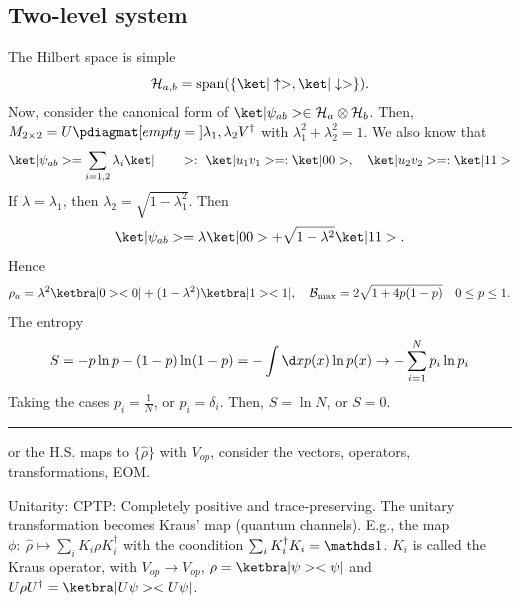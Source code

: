\subsection{Two-level system}

The Hilbert space is simple
\[
  \mathcal H_{a,b} = \operatorname{span}(\{\ket|\uparrow>, \ket|\downarrow>\}).
\]
Now, consider the canonical form of $\ket|\psi_{ab}> \in \mathcal H_a \otimes
\mathcal H_b$. Then,
$M_{2\times 2} = U\pdiagmat[empty = {}]{\lambda_1, \lambda_2} V^\dagger$
with $\lambda_1^2 + \lambda_2^2 = 1$. We also know that
\[
  \ket|\psi_{ab}> = \sum_{i=1,2} \lambda_i \ket|\qquad>:\
  \ket|u_1v_1> =: \ket|00>,\quad \ket|u_2v_2> =: \ket|11>
\]
If $\lambda = \lambda_1$, then $\lambda_2 = \sqrt{1 - \lambda_1^2}$. Then
\[
  \ket|\psi_{ab}> = \lambda\ket|00> + \sqrt{1 - \lambda^2}\ket|11>.
\]
Hence
\[
  \rho_a = \lambda^2 \ketbra|0><0| + (1 - \lambda^2) \ketbra|1><1|, \quad
  \mathcal B_{\max} = 2\sqrt{1 + 4p(1 - p)}\quad 0 \leq p \leq 1.
\]
The entropy
\[
  S = -p\ln p - (1 - p)\ln(1 - p)
    = -\int \d x p(x) \ln p(x) \to -\sum_{i=1}^N p_i \ln p_i
\]
Taking the cases $p_i = \frac1N$, or $p_i = \delta_{i}$.
Then, $S = \ln N$, or $S = 0$.

\noindent\rule\linewidth{.5pt}

For the H.S. maps to $\{\hat \rho\}$ with $V_{op}$, consider the
vectors, operators, transformations, EOM.

Unitarity: CPTP: Completely positive and trace-preserving.
The unitary transformation becomes Kraus' map (quantum channels).
E.g., the map $\phi:\ \hat\rho \mapsto \sum_i K_i \rho K_i^\dagger$
with the coondition $\sum_i K_i^\dagger K_i = \identity$.
$K_i$ is called the Kraus operator, with $V_{op}\to V_{op}$,
$\rho = \ketbra|\psi><\psi|$ and $U\rho U^\dagger = \ketbra|U\psi><U\psi|$.
